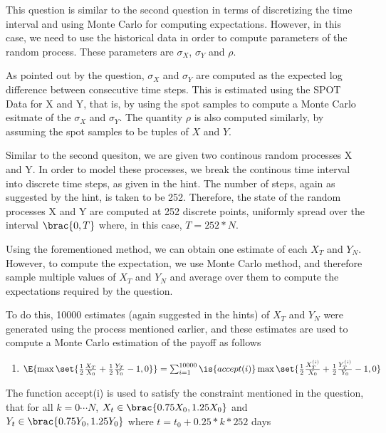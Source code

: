 \documentclass{article}
\begin{document}
\begin{question}

	This question is similar to the second question in terms of discretizing the time interval and using Monte Carlo for computing expectations. However, in this case, we need to use the historical data in order to compute parameters of the random process. These parameters are $\sigma_X$, $\sigma_Y$ and $\rho$.

	As pointed out by the question, $\sigma_X$ and $\sigma_Y$ are computed as the expected log difference between consecutive time steps. This is estimated using the SPOT Data for X and Y, that is, by using the spot samples to compute a Monte Carlo esitmate of the $\sigma_X$ and $\sigma_Y$. The quantity $\rho$ is also computed similarly, by assuming the spot samples to be tuples of $X$ and $Y$.

	Similar to the second quesiton, we are given two continous random processes X and Y. In order to model these processes, we break the continous time interval into discrete time steps, as given in the hint. The number of steps, again as suggested by the hint, is taken to be 252. Therefore, the state of the random processes X and Y are computed at 252 discrete points, uniformly spread over the interval $\brac{0, T}$ where, in this case, $T = 252 * N$.

	Using the forementioned method, we can obtain one estimate of each $X_T$ and $Y_N$. However, to compute the expectation, we use Monte Carlo method, and therefore sample multiple values of $X_T$ and $Y_N$ and average over them to compute the expectations required by the question.

	To do this, 10000 estimates (again suggested in the hints) of $X_T$ and $Y_N$ were generated using the process mentioned earlier, and these estimates are used to compute a Monte Carlo estimation of the payoff as follows
	\begin{enumerate}
		\item $\E{\max\set{\frac{1}{2} \frac{X_T}{X_0} + \frac{1}{2} \frac{Y_T}{Y_0} - 1, 0}} = \sum_{i = 1}^{10000} \is{accept(i)} \max\set{\frac{1}{2}\frac{X_T^{(i)}}{X_0} + \frac{1}{2} \frac{Y_T^{(i)}}{Y_0} - 1, 0}$
	\end{enumerate}

	The function accept(i) is used to satisfy the constraint mentioned in the question, that for all $k = 0 \cdots N$, $X_t \in \brac{0.75 X_0, 1.25 X_0}$ and $Y_t \in \brac{0.75 Y_0, 1.25 Y_0}$ where $t = t_0 + 0.25 * k * 252$ days


\end{question}
\end{document}
